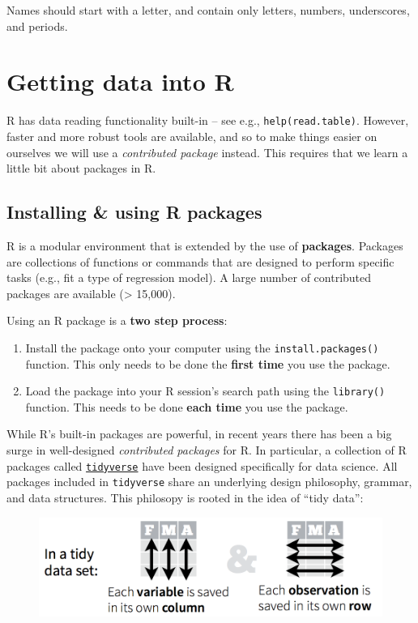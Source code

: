 \documentclass[]{book}
\begin{document}
Names should start with a letter, and contain only letters, numbers,
underscores, and periods.

\section{Getting data into R}\label{getting-data-into-r}

R has data reading functionality built-in -- see e.g.,
\texttt{help(read.table)}. However, faster and more robust tools are
available, and so to make things easier on ourselves we will use a
\emph{contributed package} instead. This requires that we learn a little
bit about packages in R.

\subsection{Installing \& using R
packages}\label{installing-using-r-packages}

R is a modular environment that is extended by the use of
\textbf{packages}. Packages are collections of functions or commands
that are designed to perform specific tasks (e.g., fit a type of
regression model). A large number of contributed packages are available
(\textgreater{} 15,000).

Using an R package is a \textbf{two step process}:

\begin{enumerate}
\def\labelenumi{\arabic{enumi}.}
\item
  Install the package onto your computer using the
  \texttt{install.packages()} function. This only needs to be done the
  \textbf{first time} you use the package.
\item
  Load the package into your R session's search path using the
  \texttt{library()} function. This needs to be done \textbf{each time}
  you use the package.
\end{enumerate}

While R's built-in packages are powerful, in recent years there has been
a big surge in well-designed \emph{contributed packages} for R. In
particular, a collection of R packages called
\href{https://www.tidyverse.org/}{\texttt{tidyverse}} have been designed
specifically for data science. All packages included in
\texttt{tidyverse} share an underlying design philosophy, grammar, and
data structures. This philosopy is rooted in the idea of ``tidy data'':

\begin{figure}
\centering
\includegraphics{R/Rintro/images/tidy_data.png}
\caption{}
\end{figure}
\end{document}
